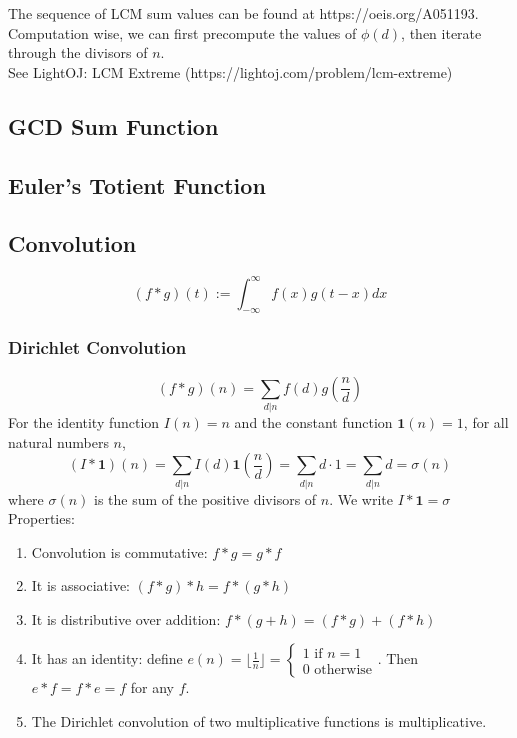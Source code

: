 \documentclass[12pt]{extarticle}
\begin{document}
The sequence of LCM sum values can be found at https://oeis.org/A051193.\\
Computation wise, we can first precompute the values of $\phi(d)$, then iterate through the divisors of $n$.\\
See LightOJ: LCM Extreme (https://lightoj.com/problem/lcm-extreme)

\subsection*{GCD Sum Function}


\subsection*{Euler's Totient Function}

\subsection*{Convolution}
$$(f*g)(t) := \int_{-\infty}^{\infty}f(x)g(t-x)dx$$
\subsubsection*{Dirichlet Convolution}
$$(f*g)(n)=\sum_{d|n}f(d)g(\frac{n}{d})$$
For the identity function $I(n)=n$ and the constant function $\mathbf{1}(n)=1$, for all natural numbers $n$, $$(I * \mathbf{1})(n)=\sum_{d|n}I(d)\mathbf{1}(\frac{n}{d})=\sum_{d|n}d\cdot 1=\sum_{d|n}d=\sigma(n)$$ where $\sigma(n)$ is the sum of the positive divisors of $n$. We write $I*\mathbf{1}=\sigma$\\
Properties:
\begin{enumerate}
\item Convolution is commutative: $f*g=g*f$
\item It is associative: $(f*g)*h=f*(g*h)$
\item It is distributive over addition: $f*(g+h)=(f*g)+(f*h)$
\item It has an identity: define $e(n)=\lfloor\frac{1}{n}\rfloor=\begin{cases}1 \text{ if } n=1 \\ 0 \text{ otherwise} \end{cases}$. Then $e*f=f*e=f$ for any $f$.
\item The Dirichlet convolution of two multiplicative functions is multiplicative.
\end{enumerate}
\end{document}
